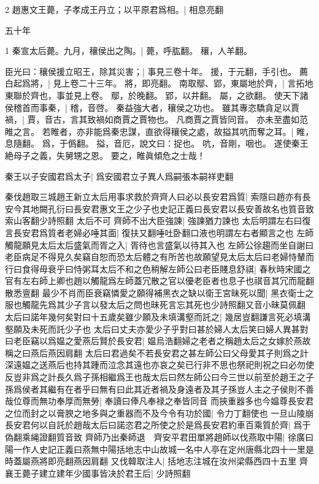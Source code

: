 2 趙惠文王薨，子孝成王丹立；以平原君爲相。|{
	相息亮翻
	}


五十年

1 秦宣太后薨。九月，穰侯出之陶。|{
	薨，呼肱翻。
	穰，人羊翻。
	}


臣光曰：穰侯援立昭王，除其災害；|{
	事見三卷十年。
	援，于元翻，手引也。
	}
薦白起爲將，|{
	見上卷二十三年。
	將，即亮翻。
	}
南取鄢、郢，東屬地於齊，|{
	言拓地東聯於齊也，事並見上卷。
	鄢，於晚翻。
	郢，以井翻。
	屬，之欲翻。
	}
使天下諸侯稽首而事秦，|{
	稽，音啓。
	}
秦益強大者，穰侯之功也。
雖其專恣驕貪足以賈禍，|{
	賈，音古，言其致禍如商賈之賈物也。
	凡商賈之賈皆同音。
	}
亦未至盡如范睢之言。
若睢者，亦非能爲秦忠謀，直欲得穰侯之處，故搤其吭而奪之耳。|{
	睢，息隨翻。
	爲，于僞翻。
	搤，音厄，說文曰：捉也。
	吭，音剛，咽也。
	}
遂使秦王絶母子之義，失舅甥之恩。
要之，睢眞傾危之士哉！

秦王以子安國君爲太子|{
	爲安國君立子異人爲嗣張本嗣祥吏翻}

秦伐趙取三城趙王新立太后用事求救於齊齊人曰必以長安君爲質|{
	索隱曰趙亦有長安今其地闕孔衍曰長安君惠文王之少子也史記正義曰長安君以長安善故名也質音致索山客翻少詩照翻}
太后不可
齊師不出大臣強諫|{
	強諫猶力諫也}
太后明謂左右曰復言長安君爲質者老婦必唾其面|{
	復扶又翻唾吐卧翻口液也明謂左右者顯言之也}
左師觸龍願見太后太后盛氣而胥之入|{
	胥待也言盛氣以待其入也}
左師公徐趨而坐自謝曰老臣病足不得見久矣竊自恕而恐太后體之有所苦也故願望見太后太后曰老婦恃輦而行曰食得毋衰乎曰恃粥耳太后不和之色稍解左師公曰老臣賤息舒祺|{
	春秋時宋國之官有左右師上卿也趙以觸龍爲左師蓋冗散之官以優老臣者也息子也祺音其冗而龍翻散悉亶翻}
最少不肖而臣衰竊憐愛之願得補黑衣之缺以衛王宮昧死以聞|{
	黑衣衛士之服也觸龍先爲其少子言以發太后之問也昧死言忘其死也少詩照翻又音小昧莫佩翻}
太后曰諾年幾何矣對曰十五歲矣雖少願及未填溝壑而託之|{
	幾居豈翻謙言死必填溝壑願及未死而託少子也}
太后曰丈夫亦愛少子乎對曰甚於婦人太后笑曰婦人異甚對曰老臣竊以爲媪之愛燕后賢於長安君|{
	媪烏浩翻婦之老者之稱趙太后之女嫁於燕故稱之曰燕后燕因肩翻}
太后曰君過矣不若長安君之甚左師公曰父母愛其子則爲之計深遠媪之送燕后也持其踵而泣念其遠也亦哀之矣已行非不思也祭祀則祝之曰必勿使反豈非爲之計長久爲子孫相繼爲王也哉太后曰然左師公曰今三世以前至於趙王之子孫爲侯者其繼有在者乎曰無有曰此其近者禍及身遠者及其子孫豈人主之子侯則不善哉位尊而無功奉厚而無勞|{
	奉讀曰俸凡奉禄之奉皆同音}
而挾重器多也今媪尊長安君之位而封之以膏腴之地多與之重器而不及今令有功於國|{
	令力丁翻使也}
一旦山陵崩長安君何以自託於趙哉太后曰諾恣君之所使之於是爲長安君約車百乘質於齊|{
	爲于偽翻乘䋲證翻質音致}
齊師乃出秦師退　齊安平君田單將趙師以伐燕取中陽|{
	徐廣曰陽一作人史記正義曰燕無中陽括地志中山故城一名中人亭在定州唐縣北四十一里是時蓋屬燕將即亮翻燕因肩翻}
又伐韓取注人|{
	括地志注城在汝州梁縣西四十五里}
齊襄王薨子建立建年少國事皆决於君王后|{
	少詩照翻}


